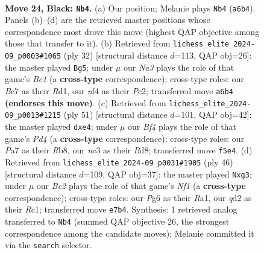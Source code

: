 \documentclass[11pt]{article}
\begin{document}
\begin{figure}[p]\centering
\begin{subfigure}{0.46\textwidth}\centering
\resizebox{\linewidth}{!}{%
\newchessgame
\chessboard[
  setfen={r2q3r/ppp1b1k1/n4pp1/3P1b1p/P1p1RN2/2N3P1/RPPQ1P1P/2B3K1 b - - 2 24},
  showmover=false,
  pgfstyle=straightmove, color=movearrow, markmove={a6-b4}
]}
\caption{}
\end{subfigure}\hfill
\begin{subfigure}{0.46\textwidth}\centering
\resizebox{\linewidth}{!}{%
\newchessgame
\chessboard[
  setfen={r4rk1/pp1qbpp1/2n2np1/3p4/2pP4/P1N3PP/1PP1QPB1/R1BR2K1 w - - 3 17},
  showmover=false,
  pgfstyle=straightmove, color=movearrow, markmove={c1-g5}
]}
\caption{}
\end{subfigure}
\\[4pt]
\begin{subfigure}{0.46\textwidth}\centering
\resizebox{\linewidth}{!}{%
\newchessgame
\chessboard[
  setfen={1r1b2k1/rq1n1pp1/2b1p2p/p2p4/3PN3/1P2PNP1/R1B2P1P/R2QB1K1 b - - 0 26},
  showmover=false,
  pgfstyle=straightmove, color=movearrow, markmove={d5-e4}
]}
\caption{}
\end{subfigure}\hfill
\begin{subfigure}{0.46\textwidth}\centering
\resizebox{\linewidth}{!}{%
\newchessgame
\chessboard[
  setfen={1rr3k1/1p2qppb/3p1n1p/PB1p4/Q2Pp3/2P1P1nP/5PP1/R1R2NK1 w - - 0 24},
  showmover=false,
  pgfstyle=straightmove, color=movearrow, markmove={f1-g3}
]}
\caption{}
\end{subfigure}
\caption{\textbf{Move 24, Black: \texttt{Nb4}.} (a) Our position; Melanie plays \texttt{Nb4} (\texttt{a6b4}). Panels (b)--(d) are the retrieved master positions whose correspondence most drove this move (highest QAP objective among those that transfer to it). (b) Retrieved from \texttt{lichess\_elite\_2024-09\_p0003\#1065} (ply 32) [structural distance $d$=113, QAP obj=26]: the master played \texttt{Bg5}; under $\mu$ our \emph{Na3} plays the role of that game's \emph{Bc1} (a \textbf{cross-type} correspondence); cross-type roles: our \emph{B}e7 as their \emph{R}d1, our \emph{n}f4 as their \emph{P}c2; transferred move \texttt{a6b4} \textbf{(endorses this move)}. (c) Retrieved from \texttt{lichess\_elite\_2024-09\_p0013\#1215} (ply 51) [structural distance $d$=101, QAP obj=42]: the master played \texttt{dxe4}; under $\mu$ our \emph{Bf4} plays the role of that game's \emph{Pd4} (a \textbf{cross-type} correspondence); cross-type roles: our \emph{P}a7 as their \emph{R}b8, our \emph{n}c3 as their \emph{B}d8; transferred move \texttt{f5e4}. (d) Retrieved from \texttt{lichess\_elite\_2024-09\_p0031\#1905} (ply 46) [structural distance $d$=109, QAP obj=37]: the master played \texttt{Nxg3}; under $\mu$ our \emph{Be2} plays the role of that game's \emph{Nf1} (a \textbf{cross-type} correspondence); cross-type roles: our \emph{P}g6 as their \emph{R}a1, our \emph{q}d2 as their \emph{R}c1; transferred move \texttt{e7b4}. Synthesis: 1 retrieved analog transferred to \texttt{Nb4} (summed QAP objective 26, the strongest correspondence among the candidate moves); Melanie committed it via the \texttt{search} selector.}
\label{fig:thought-m47}
\end{figure}
\end{document}
